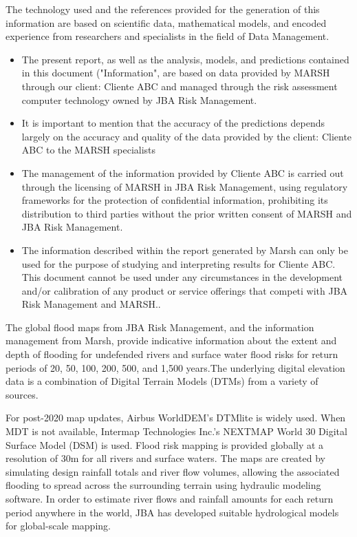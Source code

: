 \documentclass[
]{article}
\begin{document}
\noindent \fontsize{11}{13}\selectfont The technology used and the
references provided for the generation of this information are based on
scientific data, mathematical models, and encoded experience from
researchers and specialists in the field of Data Management.

\begin{itemize}
  \item {\fontsize{11}{13}\selectfont The present report, as well as the analysis, models,    and predictions contained in this document ("Information", are based on data provided by    MARSH through our client: Cliente ABC and managed through the risk         assessment computer technology owned by JBA Risk Management.}
  \item {\fontsize{11}{13}\selectfont It is important to mention that the accuracy of the     predictions depends largely on the accuracy and quality of the data provided by the         client: Cliente ABC to the MARSH specialists}
  \item {\fontsize{11}{13}\selectfont The management of the information provided by Cliente ABC is carried out through the licensing of MARSH in JBA Risk             Management, using regulatory frameworks for the protection of confidential information,     prohibiting its distribution to third parties without the prior written consent of MARSH    and JBA Risk Management.}
  \item {\fontsize{11}{13}\selectfont The information described within the report generated   by Marsh can only be used for the purpose of studying and interpreting results for Cliente ABC. This document cannot be used under any circumstances in the          development and/or calibration of any product or service offerings that competi with JBA    Risk Management and MARSH..}
\end{itemize}

\fontsize{11}{13}\selectfont The global flood maps from JBA Risk
Management, and the information management from Marsh, provide
indicative information about the extent and depth of flooding for
undefended rivers and surface water flood risks for return periods of
20, 50, 100, 200, 500, and 1,500 years.The underlying digital elevation
data is a combination of Digital Terrain Models (DTMs) from a variety of
sources.

\fontsize{11}{13}\selectfont For post-2020 map updates, Airbus
WorldDEM's DTMlite is widely used. When MDT is not available, Intermap
Technologies Inc.'s NEXTMAP World 30 Digital Surface Model (DSM) is
used. Flood risk mapping is provided globally at a resolution of 30m for
all rivers and surface waters. The maps are created by simulating design
rainfall totals and river flow volumes, allowing the associated flooding
to spread across the surrounding terrain using hydraulic modeling
software. In order to estimate river flows and rainfall amounts for each
return period anywhere in the world, JBA has developed suitable
hydrological models for global-scale mapping.
\end{document}
